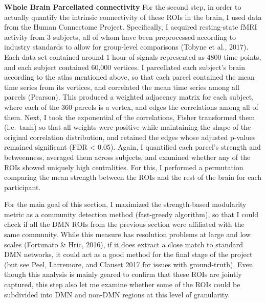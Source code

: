 \documentclass[9pt,twocolumn,twoside,]{pnas-new}
\begin{document}
\textbf{Whole Brain Parcellated connectivity} For the second step, in
order to actually quantify the intrinsic connectivity of these ROIs in
the brain, I used data from the Human Connectome Project. Specifically,
I acquired resting-state fMRI activity from 3 subjects, all of whom have
been preprocessed according to industry standards to allow for
group-level comparisons (Tobyne et al., 2017). Each data set contained
around 1 hour of signals represented as 4800 time points, and each
subject contained 60,000 vertices. I parcellated each subject's brain
according to the atlas mentioned above, so that each parcel contained
the mean time series from its vertices, and correlated the mean time
series among all parcels (Pearson). This produced a weighted adjacency
matrix for each subject, where each of the 360 parcels is a vertex, and
edges the correlations among all of them. Next, I took the exponential
of the correlations, Fisher transformed them (i.e.~tanh) so that all
weights were positive while maintaining the shape of the original
correlation distribution, and retained the edges whose adjusted p-values
remained significant (FDR \textless{} 0.05). Again, I quantified each
parcel's strength and betweenness, averaged them across subjects, and
examined whether any of the ROIs showed uniquely high centralities. For
this, I performed a permutation comparing the mean strength between the
ROIs and the rest of the brain for each participant.

For the main goal of this section, I maximized the strength-based
modularity metric as a community detection method (fast-greedy
algorithm), so that I could check if all the DMN ROIs from the previous
section were affiliated with the same community. While this measure has
resolution problems at large and low scales (Fortunato \& Hric, 2016),
if it does extract a close match to standard DMN networks, it could act
as a good method for the final stage of the project (but see Peel,
Larremore, and Clauset 2017 for issues with ground-truth). Even though
this analysis is mainly geared to confirm that these ROIs are jointly
captured, this step also let me examine whether some of the ROIs could
be subdivided into DMN and non-DMN regions at this level of granularity.
\end{document}
